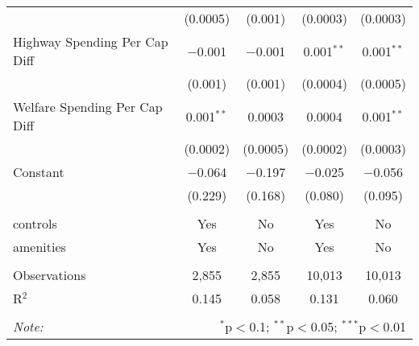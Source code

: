 \begin{table}[!htbp]
\begin{tabular}{@{\extracolsep{5pt}}lcccc}
  & (0.0005) & (0.001) & (0.0003) & (0.0003) \\ 
  Highway Spending Per Cap Diff & $-$0.001 & $-$0.001 & 0.001$^{**}$ & 0.001$^{**}$ \\ 
  & (0.001) & (0.001) & (0.0004) & (0.0005) \\ 
  Welfare Spending Per Cap Diff & 0.001$^{**}$ & 0.0003 & 0.0004 & 0.001$^{**}$ \\ 
  & (0.0002) & (0.0005) & (0.0002) & (0.0003) \\ 
  Constant & $-$0.064 & $-$0.197 & $-$0.025 & $-$0.056 \\ 
  & (0.229) & (0.168) & (0.080) & (0.095) \\ 
 \hline \\[-1.8ex] 
controls & Yes & No & Yes & No \\ 
amenities & Yes & No & Yes & No \\ 
\hline \\[-1.8ex] 
Observations & 2,855 & 2,855 & 10,013 & 10,013 \\ 
R$^{2}$ & 0.145 & 0.058 & 0.131 & 0.060 \\ 
\hline 
\hline \\[-1.8ex] 
\textit{Note:}  & \multicolumn{4}{r}{$^{*}$p$<$0.1; $^{**}$p$<$0.05; $^{***}$p$<$0.01} \\ 
\end{tabular} 
\end{table} 
